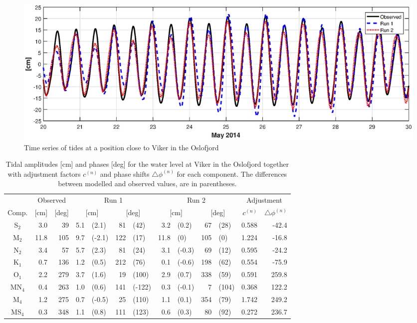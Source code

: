 \begin{figure}[!t]
\centering
\includegraphics[width=\textwidth]{fig_Viker_timeseries}
\caption{Time series of tides at a position close to Viker in the Oslofjord}
\label{fig:Viker_timeseries}
\end{figure}



\begin{table}[ht]
\caption{Tidal amplitudes [cm] and phases [deg] for the water level at Viker in the Oslofjord together with adjustment factors $c^{(n)}$ and phase shifts $\triangle \phi^{(n)}$ for each component. The differences between modelled and observed values, are in parentheses.}
\label{tab:Viker}
\centering
\begin{tabular}{crrr@{ }lr@{ }lr@{ }lr@{ }lrr} \hline
      & \multicolumn{2}{c}{Observed} & \multicolumn{4}{c}{Run 1} & \multicolumn{4}{c}{Run 2} & \multicolumn{2}{c}{Adjustment} \\
Comp. & [cm] & [deg] & \multicolumn{2}{c}{[cm]} & \multicolumn{2}{c}{[deg]} & \multicolumn{2}{c}{[cm]} & \multicolumn{2}{c}{[deg]} & $c^{(n)}$ & $\triangle \phi^{(n)}$  \\ \hline 
S$_2$  &   3.0 &  39 &  5.1 & (2.1)  &  81 & (42)   &  3.2 & (0.2)  &  67 & (28)  &  0.588 &   -42.4   \\
M$_2$  &  11.8 & 105 &  9.7 & (-2.1) & 122 & (17)   & 11.8 & (0)    & 105 & (0)   &  1.224 &   -16.8   \\
N$_2$  &   3.4 &  57 &  5.7 & (2.3)  &  81 & (24)   &  3.1 & (-0.3) &  69 & (12)  &  0.595 &   -24.2   \\
K$_1$  &   0.7 & 136 &  1.2 & (0.5)  & 212 & (76)   &  0.1 & (-0.6) & 198 & (62)  &  0.554 &   -75.9   \\
O$_1$  &   2.2 & 279 &  3.7 & (1.6)  &  19 & (100)  &  2.9 & (0.7)  & 338 & (59)  &  0.591 &   259.8   \\
MN$_4$ &   0.4 & 263 &  1.0 & (0.6)  & 141 & (-122) &  0.3 & (-0.1) &   7 & (104) &  0.368 &   122.2   \\
M$_4$  &   1.2 & 275 &  0.7 & (-0.5) &  25 & (110)  &  1.1 & (0.1)  & 354 & (79)  &  1.742 &   249.2   \\
MS$_4$ &   0.3 & 348 &  1.1 & (0.8)  & 111 & (123)  &  0.6 & (0.3)  &  80 & (92)  &  0.272 &   236.7   \\ \hline
\end{tabular}
\end{table}

